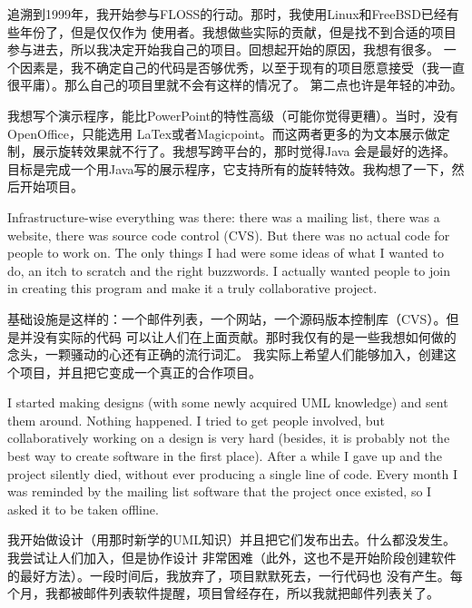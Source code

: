 

\noindent{}追溯到1999年，我开始参与FLOSS的行动。那时，我使用Linux和FreeBSD已经有些年份了，但是仅仅作为
使用者。我想做些实际的贡献，但是找不到合适的项目参与进去，所以我决定开始我自己的项目。回想起开始的原因，我想有很多。
一个因素是，我不确定自己的代码是否够优秀，以至于现有的项目愿意接受（我一直很平庸）。那么自己的项目里就不会有这样的情况了。
第二点也许是年轻的冲劲。

我想写个演示程序，能比PowerPoint的特性高级（可能你觉得更糟）。当时，没有OpenOffice，只能选用
LaTex或者Magicpoint。而这两者更多的为文本展示做定制，展示旋转效果就不行了。我想写跨平台的，那时觉得Java
会是最好的选择。目标是完成一个用Java写的展示程序，它支持所有的旋转特效。我构想了一下，然后开始项目。

Infrastructure-wise everything was there: there was a mailing list, there was a
website, there was source code control (CVS). But there was no actual code for
people to work on. The only things I had were some ideas of what I wanted to do,
an itch to scratch and the right buzzwords. I actually wanted people to join in
creating this program and make it a truly collaborative project.

基础设施是这样的：一个邮件列表，一个网站，一个源码版本控制库（CVS）。但是并没有实际的代码
可以让人们在上面贡献。那时我仅有的是一些我想如何做的念头，一颗骚动的心还有正确的流行词汇。
我实际上希望人们能够加入，创建这个项目，并且把它变成一个真正的合作项目。

I started making designs (with some newly acquired UML knowledge) and sent them
around. Nothing happened. I tried to get people involved, but collaboratively
working on a design is very hard (besides, it is probably not the best way to
create software in the first place). After a while I gave up and the project
silently died, without ever producing a single line of code. Every month I was
reminded by the mailing list software that the project once existed, so I asked
it to be taken offline.

我开始做设计（用那时新学的UML知识）并且把它们发布出去。什么都没发生。我尝试让人们加入，但是协作设计
非常困难（此外，这也不是开始阶段创建软件的最好方法）。一段时间后，我放弃了，项目默默死去，一行代码也
没有产生。每个月，我都被邮件列表软件提醒，项目曾经存在，所以我就把邮件列表关了。

